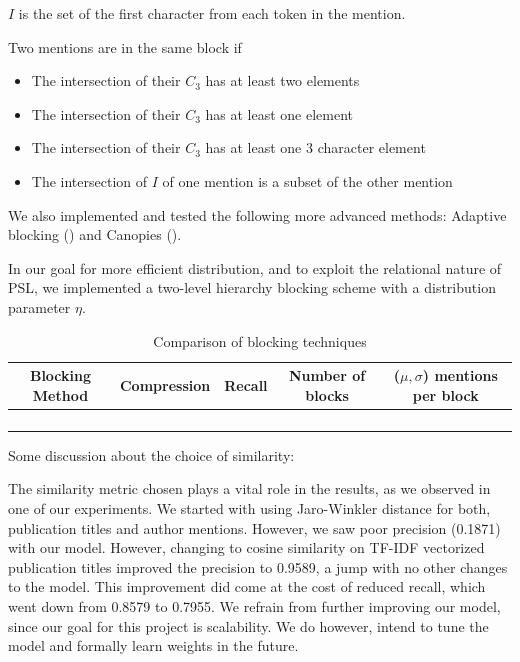 \documentclass{article}
\begin{document}
$I$ is the set of the first character from each token in the mention.

Two mentions are in the same block if

\begin{itemize}
    \item The intersection of their $C_3$ has at least two elements
    \item The intersection of their $C_3$ has at least one element
    \item The intersection of their $C_3$ has at least one 3 character element
    \item The intersection of $I$ of one mention is a subset of the other mention
\end{itemize}


We also implemented and tested the following more advanced methods: Adaptive blocking (\cite{bilenko2006adaptive}) and Canopies (\cite{mccallum2000efficient}).

In our goal for more efficient distribution, and to exploit the relational nature of PSL, we implemented a two-level hierarchy blocking scheme with a distribution parameter $\eta$.

\begin{table}
   \begin{center}
      \begin{tabular}{| c | c | c | c | c |}
         \hline
            Blocking Method & Compression & Recall & Number of blocks & ($\mu, \sigma$) mentions per block \\
         \hline
             & & & &  \\
             & & & &  \\
             & & & &  \\
             & & & &  \\
         \hline
      \end{tabular}
      \caption{Comparison of blocking techniques}
      \label{tab:blocking-stats-compare}
   \end{center}
\end{table}


Some discussion about the choice of similarity:

The similarity metric chosen plays a vital role in the results, as we observed in one of our experiments. We started with using Jaro-Winkler distance for both, publication titles and author mentions. However, we saw poor precision (0.1871) with our model. However, changing to cosine similarity on TF-IDF vectorized publication titles improved the precision to 0.9589, a jump with no other changes to the model. This improvement did come at the cost of reduced recall, which went down from 0.8579 to 0.7955. We refrain from further improving our model, since our goal for this project is scalability. We do however, intend to tune the model and formally learn weights in the future.
\end{document}
